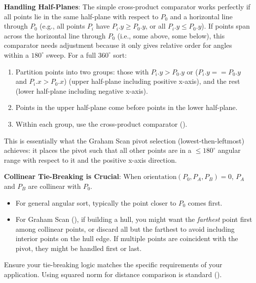 \begin{warning}
\label{warn:A.4.2.cross_product_half_plane}
\textbf{Handling Half-Planes}: The simple cross-product comparator works perfectly if all points lie in the same half-plane with respect to $P_0$ and a horizontal line through $P_0$ (e.g., all points $P_i$ have $P_i.y \ge P_0.y$, or all $P_i.y \le P_0.y$). If points span across the horizontal line through $P_0$ (i.e., some above, some below), this comparator needs adjustment because it only gives relative order for angles within a $180^\circ$ sweep.
For a full $360^\circ$ sort:
\begin{enumerate}
    \item Partition points into two groups: those with $P_i.y > P_0.y$ or ($P_i.y == P_0.y$ and $P_i.x > P_0.x$) (upper half-plane including positive x-axis), and the rest (lower half-plane including negative x-axis).
    \item Points in the upper half-plane come before points in the lower half-plane.
    \item Within each group, use the cross-product comparator ().
\end{enumerate}
This is essentially what the Graham Scan pivot selection (lowest-then-leftmost) achieves: it places the pivot such that all other points are in a $\le 180^\circ$ angular range with respect to it and the positive x-axis direction.
\end{warning}

\begin{gotcha}
\label{gotcha:A.4.2.collinear_tie_breaking}
\textbf{Collinear Tie-Breaking is Crucial}:
When $\text{orientation}(P_0, P_A, P_B) = 0$, $P_A$ and $P_B$ are collinear with $P_0$.
\begin{itemize}
    \item For general angular sort, typically the point closer to $P_0$ comes first.
    \item For Graham Scan (), if building a hull, you might want the \textit{farthest} point first among collinear points, or discard all but the farthest to avoid including interior points on the hull edge. If multiple points are coincident with the pivot, they might be handled first or last.
\end{itemize}
Ensure your tie-breaking logic matches the specific requirements of your application. Using squared norm for distance comparison is standard ().
\end{gotcha}

